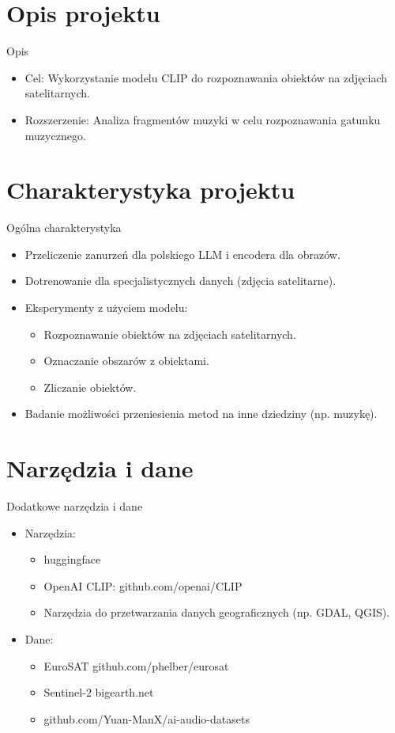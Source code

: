 \documentclass{beamer}
\begin{document}
\section{Opis projektu}
\begin{frame}{Opis}
  \begin{itemize}
    \item Cel: Wykorzystanie modelu CLIP do rozpoznawania obiektów na zdjęciach satelitarnych.
    \item Rozszerzenie: Analiza fragmentów muzyki w celu rozpoznawania gatunku muzycznego.
  \end{itemize}
\end{frame}

\section{Charakterystyka projektu}
\begin{frame}{Ogólna charakterystyka}
  \begin{itemize}
    \item Przeliczenie zanurzeń dla polskiego LLM i encodera dla obrazów.
    \item Dotrenowanie dla specjalistycznych danych (zdjęcia satelitarne).
    \item Eksperymenty z użyciem modelu:
      \begin{itemize}
        \item Rozpoznawanie obiektów na zdjęciach satelitarnych.
        \item Oznaczanie obszarów z obiektami.
        \item Zliczanie obiektów.
      \end{itemize}
    \item Badanie możliwości przeniesienia metod na inne dziedziny (np. muzykę).
  \end{itemize}
\end{frame}

\section{Narzędzia i dane}
\begin{frame}{Dodatkowe narzędzia i dane}
  \begin{itemize}
    \item Narzędzia:
      \begin{itemize}
        \item huggingface
        \item OpenAI CLIP: github.com/openai/CLIP
        \item Narzędzia do przetwarzania danych geograficznych (np. GDAL, QGIS).
      \end{itemize}
    \item Dane:
      \begin{itemize}
        \item EuroSAT github.com/phelber/eurosat
        \item Sentinel-2 bigearth.net
        \item github.com/Yuan-ManX/ai-audio-datasets
      \end{itemize}
  \end{itemize}
\end{frame}
\end{document}
